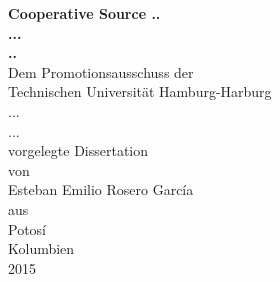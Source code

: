 \begin{titlepage}
\begin{center}


 
\textbf{\huge Cooperative Source ..\\[0.1cm]
 ... \\[0.4cm]
 ..}\\[3.0cm] 

{\Large Dem Promotionsausschuss der\\ 
Technischen Universit{\"a}t Hamburg-Harburg\\
...\\
...\\
vorgelegte Dissertation\\[3.0cm]

von}\\[0.5cm]

{\LARGE Esteban Emilio Rosero Garc\'{i}a}\\[3.0cm]

{\large aus}\\[0.5cm]

{\Large Potos\'{i}}\\
[0.4cm] {\Large Kolumbien}\\[3.0cm]

{\large 2015}
\end{center}
\end{titlepage}

\newpage{\pagestyle{empty}\cleardoublepage}  



